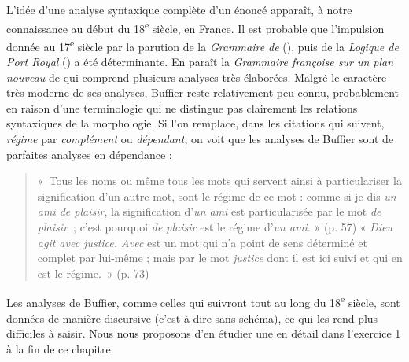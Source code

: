 {    L’idée d’une analyse syntaxique complète d’un énoncé apparaît, à notre connaissance au début du 18\textsuperscript{e} siècle, en France. Il est probable que l’impulsion donnée au 17\textsuperscript{e} siècle par la parution de la \textit{Grammaire de}  (\citealt{ArnauldLancelot1660}), puis de la \textit{Logique de Port Royal} (\citealt{ArnauldNicole1662}) a été déterminante. En \citeyear{buffier1709grammaire} paraît la \textit{Grammaire françoise sur un plan nouveau} de  qui comprend plusieurs analyses très élaborées. Malgré le caractère très moderne de ses analyses, Buffier reste relativement peu connu, probablement en raison d’une terminologie qui ne distingue pas clairement les relations syntaxiques de la morphologie. Si l’on remplace, dans les citations qui suivent, \textit{régime} par \textit{complément} ou \textit{dépendant}, on voit que les analyses de Buffier sont de parfaites analyses en dépendance :
    \begin{quote}
      «~Tous les noms ou même tous les mots qui servent ainsi à particulariser la signification d’un autre mot, sont le régime de ce mot : comme si je dis \textit{un ami de plaisir}, la signification d’\textit{un ami} est particularisée par le mot \textit{de plaisir~}; c’est pourquoi \textit{de plaisir} est le régime d’\textit{un ami}. » (p. 57) « \textit{Dieu agit avec justice. Avec} est un mot qui n’a point de sens déterminé et complet par lui-même ; mais par le mot \textit{justice} dont il est ici suivi et qui en est le régime.~» (p. 73) 
    \end{quote}
  Les analyses de Buffier, comme celles qui suivront tout au long du 18\textsuperscript{e} siècle, sont données de manière discursive (c’est-à-dire sans schéma), ce qui les rend plus difficiles à saisir. Nous nous proposons d’en étudier une en détail dans l'exercice 1 à la fin de ce chapitre.

}
